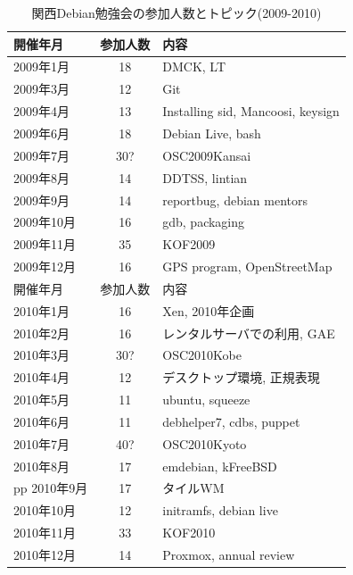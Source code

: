 \documentclass[mingoth,a4paper]{jsarticle}
\begin{document}
\begin{table}
  \begin{minipage}{.5\linewidth}
    \begin{center}
      \caption{関西Debian勉強会の参加人数とトピック(2009-2010)}
      \begin{tabular}{|l|c|p{10em}|}
        \hline
        開催年月   & 参加人数 & 内容 \\
        \hline
        2009年1月  & 18       & DMCK, LT \\
        2009年3月  & 12       & Git \\
        2009年4月  & 13       & Installing sid, Mancoosi, keysign \\
        2009年6月  & 18       & Debian Live, bash\\
        2009年7月  & 30?      & OSC2009Kansai \\
        2009年8月  & 14       & DDTSS, lintian \\
        2009年9月  & 14       & reportbug, debian mentors\\
        2009年10月 & 16       & gdb, packaging \\
        2009年11月 & 35       & KOF2009 \\
        2009年12月 & 16       & GPS program, OpenStreetMap \\
        \hline
        \hline
        開催年月   & 参加人数 & 内容 \\
        \hline
        2010年1月  & 16       & Xen, 2010年企画 \\
        2010年2月  & 16       & レンタルサーバでの利用, GAE \\
        2010年3月  & 30?      & OSC2010Kobe \\
        2010年4月  & 12       & デスクトップ環境, 正規表現 \\
        2010年5月  & 11       & ubuntu, squeeze \\
        2010年6月  & 11       & debhelper7, cdbs, puppet \\
        2010年7月  & 40?      & OSC2010Kyoto \\
        2010年8月  & 17       & emdebian, kFreeBSD \\pp
        2010年9月  & 17       & タイルWM \\
        2010年10月 & 12       & initramfs, debian live \\
        2010年11月 & 33       & KOF2010 \\
        2010年12月 & 14       & Proxmox, annual review \\
        \hline
      \end{tabular}
    \end{center}
  \end{minipage}
\end{table}
\end{document}
